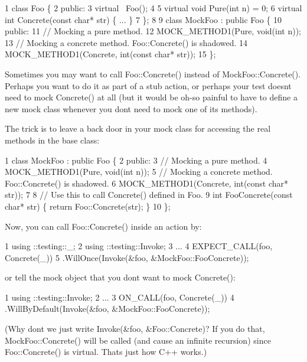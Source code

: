 \begin{DoxyCode}
1 class Foo \{
2  public:
3   virtual ~Foo();
4 
5   virtual void Pure(int n) = 0;
6   virtual int Concrete(const char* str) \{ ... \}
7 \};
8 
9 class MockFoo : public Foo \{
10  public:
11   // Mocking a pure method.
12   MOCK\_METHOD1(Pure, void(int n));
13   // Mocking a concrete method.  Foo::Concrete() is shadowed.
14   MOCK\_METHOD1(Concrete, int(const char* str));
15 \};
\end{DoxyCode}


Sometimes you may want to call {\ttfamily Foo\+::\+Concrete()} instead of {\ttfamily Mock\+Foo\+::\+Concrete()}. Perhaps you want to do it as part of a stub action, or perhaps your test doesn\textquotesingle{}t need to mock {\ttfamily Concrete()} at all (but it would be oh-\/so painful to have to define a new mock class whenever you don\textquotesingle{}t need to mock one of its methods).

The trick is to leave a back door in your mock class for accessing the real methods in the base class\+:


\begin{DoxyCode}
1 class MockFoo : public Foo \{
2  public:
3   // Mocking a pure method.
4   MOCK\_METHOD1(Pure, void(int n));
5   // Mocking a concrete method.  Foo::Concrete() is shadowed.
6   MOCK\_METHOD1(Concrete, int(const char* str));
7 
8   // Use this to call Concrete() defined in Foo.
9   int FooConcrete(const char* str) \{ return Foo::Concrete(str); \}
10 \};
\end{DoxyCode}


Now, you can call {\ttfamily Foo\+::\+Concrete()} inside an action by\+:


\begin{DoxyCode}
1 using ::testing::\_;
2 using ::testing::Invoke;
3 ...
4   EXPECT\_CALL(foo, Concrete(\_))
5       .WillOnce(Invoke(&foo, &MockFoo::FooConcrete));
\end{DoxyCode}


or tell the mock object that you don\textquotesingle{}t want to mock {\ttfamily Concrete()}\+:


\begin{DoxyCode}
1 using ::testing::Invoke;
2 ...
3   ON\_CALL(foo, Concrete(\_))
4       .WillByDefault(Invoke(&foo, &MockFoo::FooConcrete));
\end{DoxyCode}


(Why don\textquotesingle{}t we just write {\ttfamily Invoke(\&foo, \&\+Foo\+::\+Concrete)}? If you do that, {\ttfamily Mock\+Foo\+::\+Concrete()} will be called (and cause an infinite recursion) since {\ttfamily Foo\+::\+Concrete()} is virtual. That\textquotesingle{}s just how C++ works.)

